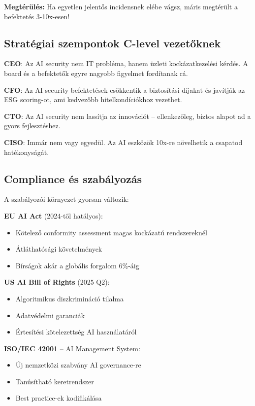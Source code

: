 \documentclass{../templates/magazine}
\begin{document}
\textbf{Megtérülés:} Ha egyetlen jelentős incidensnek elébe vágsz, máris megtérült a befektetés 3-10x-esen!

\subsection{Stratégiai szempontok C-level vezetőknek}

\textbf{CEO}: Az AI security nem IT probléma, hanem üzleti kockázatkezelési kérdés. A board és a befektetők egyre nagyobb figyelmet fordítanak rá.

\textbf{CFO}: Az AI security befektetések csökkentik a biztosítási díjakat és javítják az ESG scoring-ot, ami kedvezőbb hitelkondíciókhoz vezethet.

\textbf{CTO}: Az AI security nem lassítja az innovációt -- ellenkezőleg, biztos alapot ad a gyors fejlesztéshez.

\textbf{CISO}: Immár nem vagy egyedül. Az AI eszközök 10x-re növelhetik a csapatod hatékonyságát.

\subsection{Compliance és szabályozás}

A szabályozói környezet gyorsan változik:

\textbf{EU AI Act} (2024-től hatályos):
\begin{itemize}
    \item Kötelező conformity assessment magas kockázatú rendszereknél
    \item Átláthatósági követelmények
    \item Bírságok akár a globális forgalom 6\%-áig
\end{itemize}

\textbf{US AI Bill of Rights} (2025 Q2):
\begin{itemize}
    \item Algoritmikus diszkrimináció tilalma
    \item Adatvédelmi garanciák
    \item Értesítési kötelezettség AI használatáról
\end{itemize}

\textbf{ISO/IEC 42001} -- AI Management System:
\begin{itemize}
    \item Új nemzetközi szabvány AI governance-re
    \item Tanúsítható keretrendszer
    \item Best practice-ek kodifikálása
\end{itemize}
\end{document}
